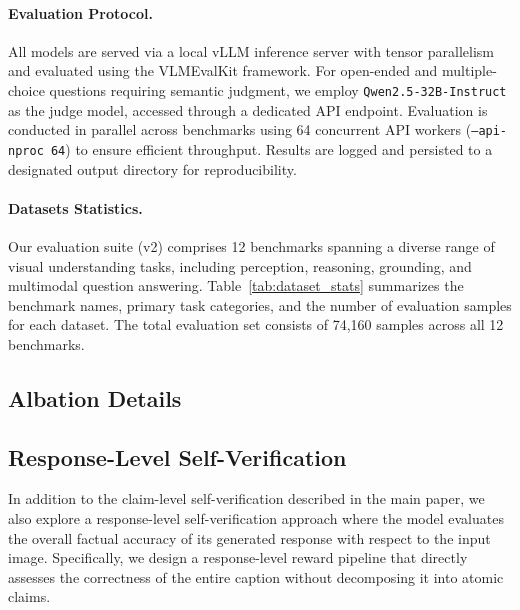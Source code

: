 \paragraph{Evaluation Protocol.}
All models are served via a local vLLM inference server with tensor parallelism and evaluated using the VLMEvalKit framework.
For open-ended and multiple-choice questions requiring semantic judgment, we employ \texttt{Qwen2.5-32B-Instruct} as the judge model, accessed through a dedicated API endpoint.
Evaluation is conducted in parallel across benchmarks using 64 concurrent API workers (\texttt{--api-nproc 64}) to ensure efficient throughput.
Results are logged and persisted to a designated output directory for reproducibility.

\paragraph{Datasets Statistics.}
Our evaluation suite (v2) comprises 12 benchmarks spanning a diverse range of visual understanding tasks, including perception, reasoning, grounding, and multimodal question answering.
Table~\ref{tab:dataset_stats} summarizes the benchmark names, primary task categories, and the number of evaluation samples for each dataset.
The total evaluation set consists of 74,160 samples across all 12 benchmarks.



\subsection{Albation Details}





\subsection{Response-Level Self-Verification}
\label{sec:response_level_self_verification}
In addition to the claim-level self-verification described in the main paper, we also explore a response-level self-verification approach where the model evaluates the overall factual accuracy of its generated response with respect to the input image.
Specifically, we design a response-level reward pipeline that directly assesses the correctness of the entire caption without decomposing it into atomic claims.



